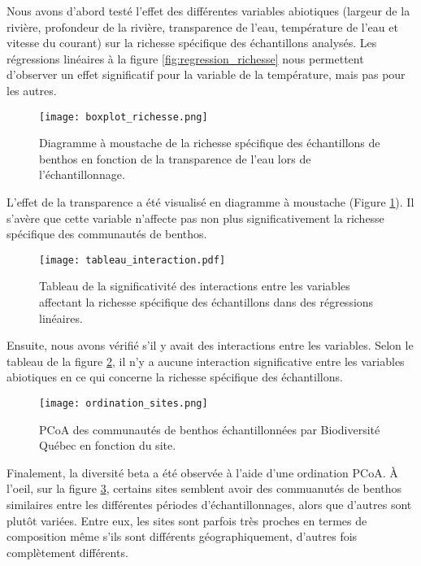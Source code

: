\documentclass[
]{article}
\begin{document}
Nous avons d'abord testé l'effet des différentes variables abiotiques
(largeur de la rivière, profondeur de la rivière, transparence de l'eau,
température de l'eau et vitesse du courant) sur la richesse spécifique
des échantillons analysés. Les régressions linéaires à la figure
\ref{fig:regression_richesse} nous permettent d'observer un effet
significatif pour la variable de la température, mais pas pour les
autres.

\begin{figure}
\centering
\texttt{[image: boxplot\_richesse.png]}
\caption{Diagramme à moustache de la richesse spécifique des échantillons de benthos en fonction de la transparence de l'eau lors de l'échantillonnage.}
\label{fig:boxplot_richesse}
\end{figure}

L'effet de la transparence a été visualisé en diagramme à moustache
(Figure \ref{fig:boxplot_richesse}). Il s'avère que cette variable
n'affecte pas non plus significativement la richesse spécifique des
communautés de benthos.

\begin{figure}
\centering
\texttt{[image: tableau\_interaction.pdf]}
\caption{Tableau de la significativité des interactions entre les variables affectant la richesse spécifique des échantillons dans des régressions linéaires.}
\label{fig:tableau_interaction}
\end{figure}

Ensuite, nous avons vérifié s'il y avait des interactions entre les
variables. Selon le tableau de la figure \ref{fig:tableau_interaction},
il n'y a aucune interaction significative entre les variables abiotiques
en ce qui concerne la richesse spécifique des échantillons.

\begin{figure}
\centering
\texttt{[image: ordination\_sites.png]}
\caption{PCoA des communautés de benthos échantillonnées par Biodiversité Québec en fonction du site.}
\label{fig:ordination_sites}
\end{figure}

Finalement, la diversité beta a été observée à l'aide d'une ordination
PCoA. À l'oeil, sur la figure \ref{fig:ordination_sites}, certains sites
semblent avoir des commuanutés de benthos similaires entre les
différentes périodes d'échantillonnages, alors que d'autres sont plutôt
variées. Entre eux, les sites sont parfois très proches en termes de
composition même s'ils sont différents géographiquement, d'autres fois
complètement différents.
\end{document}
